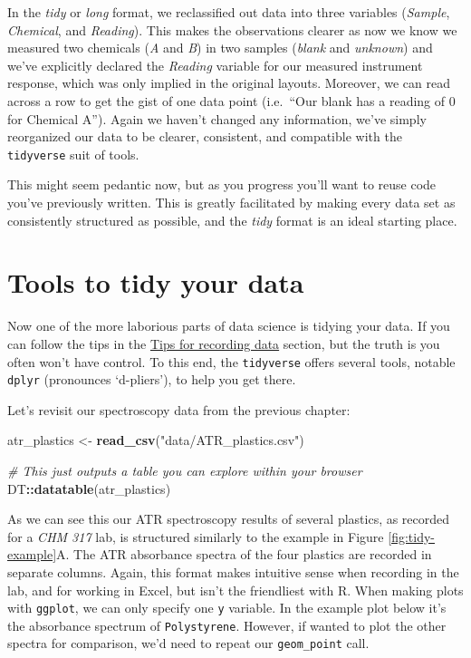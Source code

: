 \documentclass[
]{book}
\newenvironment{Shaded}{\begin{snugshade}}{\end{snugshade}}
\newcommand{\CommentTok}[1]{\textcolor[rgb]{0.56,0.35,0.01}{\textit{#1}}}
\newcommand{\FunctionTok}[1]{\textcolor[rgb]{0.13,0.29,0.53}{\textbf{#1}}}
\newcommand{\NormalTok}[1]{#1}
\newcommand{\OtherTok}[1]{\textcolor[rgb]{0.56,0.35,0.01}{#1}}
\newcommand{\SpecialCharTok}[1]{\textcolor[rgb]{0.81,0.36,0.00}{\textbf{#1}}}
\newcommand{\StringTok}[1]{\textcolor[rgb]{0.31,0.60,0.02}{#1}}
\begin{document}
In the \emph{tidy} or \emph{long} format, we reclassified out data into three variables (\emph{Sample}, \emph{Chemical}, and \emph{Reading}). This makes the observations clearer as now we know we measured two chemicals (\emph{A} and \emph{B}) in two samples (\emph{blank} and \emph{unknown}) and we've explicitly declared the \emph{Reading} variable for our measured instrument response, which was only implied in the original layouts. Moreover, we can read across a row to get the gist of one data point (i.e.~``Our blank has a reading of 0 for Chemical A''). Again we haven't changed any information, we've simply reorganized our data to be clearer, consistent, and compatible with the \texttt{tidyverse} suit of tools.

This might seem pedantic now, but as you progress you'll want to reuse code you've previously written. This is greatly facilitated by making every data set as consistently structured as possible, and the \emph{tidy} format is an ideal starting place.

\hypertarget{tools-to-tidy-your-data}{%
\section{Tools to tidy your data}\label{tools-to-tidy-your-data}}

Now one of the more laborious parts of data science is tidying your data. If you can follow the tips in the \protect\hyperlink{tips-for-recording-data}{Tips for recording data} section, but the truth is you often won't have control. To this end, the \texttt{tidyverse} offers several tools, notable \texttt{dplyr} (pronounces `d-pliers'), to help you get there.

Let's revisit our spectroscopy data from the previous chapter:

\begin{Shaded}
\begin{Highlighting}[]
\NormalTok{atr\_plastics }\OtherTok{\textless{}{-}} \FunctionTok{read\_csv}\NormalTok{(}\StringTok{"data/ATR\_plastics.csv"}\NormalTok{)}

\CommentTok{\# This just outputs a table you can explore within your browser}
\NormalTok{DT}\SpecialCharTok{::}\FunctionTok{datatable}\NormalTok{(atr\_plastics)}
\end{Highlighting}
\end{Shaded}

As we can see this our ATR spectroscopy results of several plastics, as recorded for a \emph{CHM 317} lab, is structured similarly to the example in Figure \ref{fig:tidy-example}A. The ATR absorbance spectra of the four plastics are recorded in separate columns. Again, this format makes intuitive sense when recording in the lab, and for working in Excel, but isn't the friendliest with R. When making plots with \texttt{ggplot}, we can only specify one \texttt{y} variable. In the example plot below it's the absorbance spectrum of \texttt{Polystyrene}. However, if wanted to plot the other spectra for comparison, we'd need to repeat our \texttt{geom\_point} call.
\end{document}
